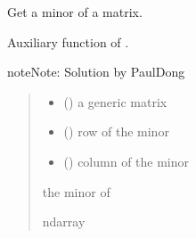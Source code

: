 \documentclass[letterpaper,10pt,english]{sphinxmanual}
\begin{document}
\begin{fulllineitems}
\label{\detokenize{cubmods:cubmods.general.get_minor}}
\pysigstartsignatures
{}
\pysigstopsignatures
\sphinxAtStartPar
Get a minor of a matrix.

\sphinxAtStartPar
Auxiliary function of .

\begin{sphinxadmonition}{note}{Note:}
\sphinxAtStartPar
Solution by PaulDong
\end{sphinxadmonition}
\begin{quote}\begin{description}
\begin{itemize}
\item {} 
\sphinxAtStartPar
{} () \textendash{} a generic matrix

\item {} 
\sphinxAtStartPar
{} () \textendash{} row of the minor

\item {} 
\sphinxAtStartPar
{} () \textendash{} column of the minor

\end{itemize}

\sphinxAtStartPar
the minor of 

\sphinxAtStartPar
ndarray

\end{description}\end{quote}

\end{fulllineitems}

\end{document}
